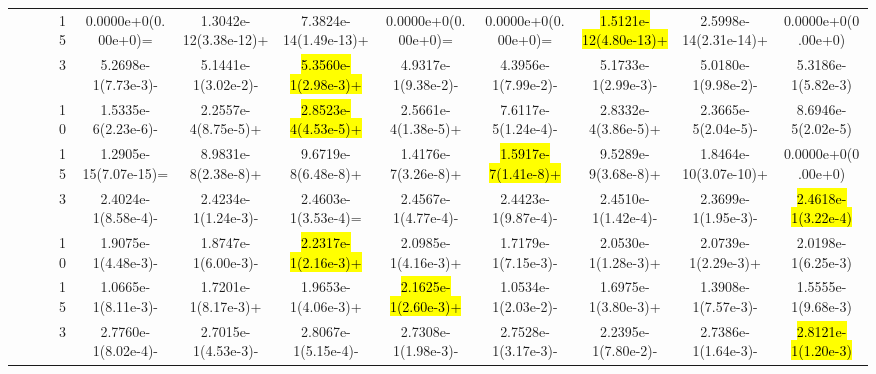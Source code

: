 \documentclass[a4paper,fleqn]{cas-dc}
\newcommand{\highlight}[1]{
	\begingroup
	\sethlcolor{Seashell}%
	\hl{#1}%
	\endgroup
}
\begin{document}
\begin{sloppypar}
\begin{table}[ht]
{\begin{tabular}{ccccccccccc}
					\multirow{12}{*}{~}&\multirow{3}{*}{~} &15 &0.0000e+0(0.00e+0)=		&1.3042e-12(3.38e-12)+	&7.3824e-14(1.49e-13)+	&0.0000e+0(0.00e+0)=	&0.0000e+0(0.00e+0)=	&\highlight{1.5121e-12(4.80e-13)+}	&2.5998e-14(2.31e-14)+	&0.0000e+0(0.00e+0)\\
					
					
					
					
					
					\multirow{12}{*}{~}&\multirow{3}{*}{MaF4} &3 &5.2698e-1(7.73e-3)-		&5.1441e-1(3.02e-2)-	&\highlight{5.3560e-1(2.98e-3)+}	&4.9317e-1(9.38e-2)-	&4.3956e-1(7.99e-2)-	&5.1733e-1(2.99e-3)-	&5.0180e-1(9.98e-2)-	&5.3186e-1(5.82e-3)\\ 
					
					\multirow{12}{*}{~}&\multirow{3}{*}{~} &10&1.5335e-6(2.23e-6)-	&2.2557e-4(8.75e-5)+	&\highlight{2.8523e-4(4.53e-5)+}	&2.5661e-4(1.38e-5)+	&7.6117e-5(1.24e-4)-	&2.8332e-4(3.86e-5)+	&2.3665e-5(2.04e-5)-	&8.6946e-5(2.02e-5)\\
					
					\multirow{12}{*}{~}&\multirow{3}{*}{~} &15 &1.2905e-15(7.07e-15)=		&8.9831e-8(2.38e-8)+	&9.6719e-8(6.48e-8)+	&1.4176e-7(3.26e-8)+	&\highlight{1.5917e-7(1.41e-8)+}	&9.5289e-9(3.68e-8)+	&1.8464e-10(3.07e-10)+	&0.0000e+0(0.00e+0)\\
					
					
					
					\midrule[0.35pt]
					\multirow{6}{*}{Partial}&\multirow{3}{*}{MaF2} &3 &2.4024e-1(8.58e-4)-		&2.4234e-1(1.24e-3)-	&2.4603e-1(3.53e-4)=	&2.4567e-1(4.77e-4)-	&2.4423e-1(9.87e-4)-	&2.4510e-1(1.42e-4)-	&2.3699e-1(1.95e-3)-	&\highlight{2.4618e-1(3.22e-4)}\\ 
					
					\multirow{6}{*}{~}&\multirow{3}{*}{~} &10 	&1.9075e-1(4.48e-3)-		&1.8747e-1(6.00e-3)-	&\highlight{2.2317e-1(2.16e-3)+}	&2.0985e-1(4.16e-3)+	&1.7179e-1(7.15e-3)-	&2.0530e-1(1.28e-3)+	&2.0739e-1(2.29e-3)+	&2.0198e-1(6.25e-3)\\
					
					\multirow{6}{*}{~}&\multirow{3}{*}{~} &15   &1.0665e-1(8.11e-3)-		&1.7201e-1(8.17e-3)+	&1.9653e-1(4.06e-3)+	&\highlight{2.1625e-1(2.60e-3)+}	&1.0534e-1(2.03e-2)-	&1.6975e-1(3.80e-3)+	&1.3908e-1(7.57e-3)-	&1.5555e-1(9.68e-3)\\
					
					
					
					
					
					\multirow{6}{*}{~}&\multirow{3}{*}{MaF8} &3 &2.7760e-1(8.02e-4)-		&2.7015e-1(4.53e-3)-	&2.8067e-1(5.15e-4)-	&2.7308e-1(1.98e-3)-	&2.7528e-1(3.17e-3)-	&2.2395e-1(7.80e-2)-	&2.7386e-1(1.64e-3)-	&\highlight{2.8121e-1(1.20e-3)}\\
					

\end{tabular}}
\end{table}
\end{sloppypar}
\end{document}
